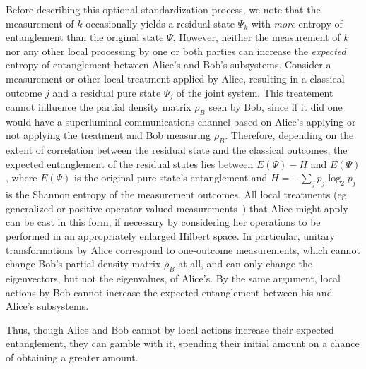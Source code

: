 Before describing this optional standardization process, we note that
the measurement of $k$ occasionally yields a residual state $\Psi_k$
with {\em more\/} entropy of entanglement than the original state
$\Psi$.  However, neither the measurement of $k$ nor any other local
processing by one or both parties can increase the {\em expected\/}
entropy of entanglement between Alice's and Bob's subsystems.  Consider
a measurement or other local treatment applied by Alice, resulting in a
classical outcome $j$ and a residual pure state $\Psi_j$ of the joint
system.  This treatement cannot influence the partial density matrix
$\rho_B$ seen by Bob, since if it did one would have a superluminal
communications channel based on Alice's applying or not applying the
treatment and Bob measuring $\rho_B$. Therefore, depending on the extent
of correlation between the residual state and the classical outcomes,
the expected entanglement of the residual states lies between $E(\Psi) -
H$ and $E(\Psi)$, where $E(\Psi)$ is the original pure state's
entanglement and $H=-\sum_jp_j\log_2p_j$ is the Shannon entropy of the
measurement outcomes.  All local treatments (eg generalized or positive
operator valued measurements~\cite{Helstrom}) that Alice might apply can be cast
in this form, if
necessary by considering her operations to be performed in an
appropriately enlarged Hilbert space.  In particular, unitary
transformations by Alice correspond to one-outcome measurements, which
cannot change Bob's partial density matrix $\rho_B$ at all, and can only
change the eigenvectors, but not the eigenvalues, of Alice's.  By the
same argument, local actions by Bob cannot increase the expected
entanglement between his and Alice's subsystems.

Thus, though Alice and Bob cannot by local actions increase their
expected entanglement, they can gamble with it, spending their initial
amount on a chance of obtaining a greater amount.


